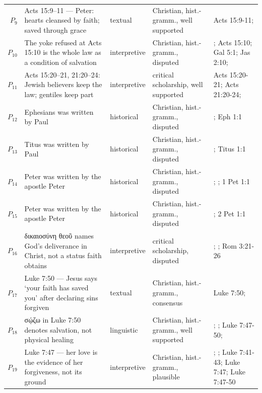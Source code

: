 \documentclass[11pt]{article}
\begin{document}
\begin{longtable}{@{}r >{\raggedright\arraybackslash}p{} l >{\raggedright\arraybackslash}p{} >{\raggedright\arraybackslash}p{}@{}}
$P_{9}$ & Acts 15:9–11 — Peter: hearts cleansed by faith; saved through grace & textual & Christian, hist.-gramm., well supported & Acts 15:9-11; \cite[ad loc. Acts 15:9]{bruce-acts-1988} \\
$P_{10}$ & The yoke refused at Acts 15:10 is the whole law as a condition of salvation & interpretive & Christian, hist.-gramm., disputed & \cite[ad loc. Acts 15:10]{bruce-acts-1988}; Acts 15:10; Gal 5:1; Jas 2:10; \cite{das-paul-law-covenant-2001} \\
$P_{11}$ & Acts 15:20–21, 21:20–24: Jewish believers keep the law; gentiles keep part & interpretive & critical scholarship, well supported & Acts 15:20-21; Acts 21:20-24; \cite{jervell-luke-people-god-1972} \\
$P_{12}$ & Ephesians was written by Paul & historical & Christian, hist.-gramm., disputed & \cite{hoehner-ephesians-2002}; Eph 1:1 \\
$P_{13}$ & Titus was written by Paul & historical & Christian, hist.-gramm., disputed & \cite{mounce-pastoral-epistles-2000}; Titus 1:1 \\
$P_{14}$ & 1 Peter was written by the apostle Peter & historical & Christian, hist.-gramm., disputed & \cite{jobes-1-peter-2005}; \cite{schreiner-peter-jude-2003}; 1 Pet 1:1 \\
$P_{15}$ & 2 Peter was written by the apostle Peter & historical & Christian, hist.-gramm., disputed & \cite{schreiner-peter-jude-2003}; 2 Pet 1:1 \\
$P_{16}$ & δικαιοσύνη θεοῦ names God's deliverance in Christ, not a status faith obtains & interpretive & critical scholarship, disputed & \cite{campbell-deliverance-god-2009}; \cite{martyn-galatians-1997}; Rom 3:21-26 \\
$P_{17}$ & Luke 7:50 — Jesus says ‘your faith has saved you’ after declaring sins forgiven & textual & Christian, hist.-gramm., consensus & Luke 7:50; \cite[ad loc. Luke 7:50]{marshall-luke-1978} \\
$P_{18}$ & σῴζω in Luke 7:50 denotes salvation, not physical healing & linguistic & Christian, hist.-gramm., well supported & \cite[Apology IV, on love and the fulfilling of the law: Luke 7:47–50]{kolb-wengert-book-of-concord-2000}; \cite[54--55]{padilla-narrative-criticism-2021}; Luke 7:47-50; \cite[ad loc. Luke 7:50]{marshall-luke-1978} \\
$P_{19}$ & Luke 7:47 — her love is the evidence of her forgiveness, not its ground & interpretive & Christian, hist.-gramm., plausible & \cite[54--54]{padilla-narrative-criticism-2021}; \cite[Apology IV, on love and the fulfilling of the law: Luke 7:47–50]{kolb-wengert-book-of-concord-2000}; Luke 7:41-43; Luke 7:47; Luke 7:47-50 \\

\end{longtable}
\end{document}
